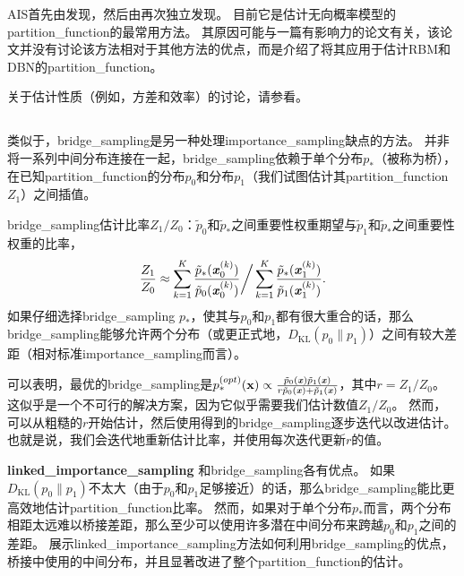 
\gls{AIS}首先由\cite{Jarzynski1997}发现，然后由\cite{Neal-2001}再次独立发现。
目前它是估计无向概率模型的\gls{partition_function}的最常用方法。
其原因可能与一篇有影响力的论文\citep{Salakhutdinov+Murray-2008}有关，该论文并没有讨论该方法相对于其他方法的优点，而是介绍了将其应用于估计\gls{RBM}和\gls{DBN}的\gls{partition_function}。


关于估计性质（例如，方差和效率）的讨论，请参看\cite{Neal-2001}。


\subsection{}
\label{sec:bridge_sampling}
类似于，\gls{bridge_sampling}\citep{Bennet76}是另一种处理\gls{importance_sampling}缺点的方法。
并非将一系列中间分布连接在一起，\gls{bridge_sampling}依赖于单个分布$p_*$（被称为桥），在已知\gls{partition_function}的分布$p_0$和分布$p_1$（我们试图估计其\gls{partition_function} $Z_1$）之间插值。


\gls{bridge_sampling}估计比率$Z_1 / Z_0$：$\tilde{p}_0$和$\tilde{p}_*$之间重要性权重期望与$\tilde{p}_1$和$\tilde{p}_*$之间重要性权重的比率，
\begin{equation}
	\frac{Z_1}{ Z_0} \approx \sum_{k=1}^K \frac{ \tilde{p}_*(\boldsymbol{\mathit{x}}_0^{(k)}) }{ \tilde{p}_0(\boldsymbol{\mathit{x}}_0^{(k)}) } \bigg/ \sum_{k=1}^K \frac{ \tilde{p}_*(\boldsymbol{\mathit{x}}_1^{(k)}) }{ \tilde{p}_1(\boldsymbol{\mathit{x}}_1^{(k)}) } .
\end{equation}
如果仔细选择\gls{bridge_sampling} $p_*$，使其与$p_0$和$p_1$都有很大重合的话，那么\gls{bridge_sampling}能够允许两个分布（或更正式地，$D_{\text{KL}}(p_0 \| p_1)$）之间有较大差距（相对标准\gls{importance_sampling}而言）。


可以表明，最优的\gls{bridge_sampling}是$p_*^{(opt)} (\mathbf{x}) \propto \frac{ \tilde{p}_0(\boldsymbol{\mathit{x}}) \tilde{p}_1(\boldsymbol{\mathit{x}}) }{ r\tilde{p}_0(\boldsymbol{\mathit{x}}) + \tilde{p}_1(\boldsymbol{\mathit{x}}) }$，其中$r = Z_1 / Z_0$。
这似乎是一个不可行的解决方案，因为它似乎需要我们估计数值$Z_1 / Z_0$。
然而，可以从粗糙的$r$开始估计，然后使用得到的\gls{bridge_sampling}逐步迭代以改进估计\citep{Neal05estimatingratios}。
也就是说，我们会迭代地重新估计比率，并使用每次迭代更新$r$的值。


\textbf{\gls{linked_importance_sampling}}
和\gls{bridge_sampling}各有优点。
如果$D_{\text{KL}}(p_0 \| p_1)$不太大（由于$p_0$和$p_1$足够接近）的话，那么\gls{bridge_sampling}能比更高效地估计\gls{partition_function}比率。
然而，如果对于单个分布$p_*$而言，两个分布相距太远难以桥接差距，那么至少可以使用许多潜在中间分布来跨越$p_0$和$p_1$之间的差距。
\cite{Neal05estimatingratios}展示\gls{linked_importance_sampling}方法如何利用\gls{bridge_sampling}的优点，桥接中使用的中间分布，并且显著改进了整个\gls{partition_function}的估计。


